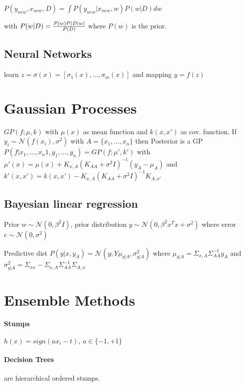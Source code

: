 \documentclass[11pt,twocolumn]{article}
\begin{document}
$P(y_{new}, x_{new}, D) = \int  P(y_{new}|x_{new}, w) P(w|D) dw$

with $P(w|D) = {{P(w) P(D|w)} \over {P(D)}}$ where $P(w)$ is the prior. 


\subsection{Neural Networks}
learn $z = \sigma(x) = [\sigma_1(x),...,\sigma_m(x)] $ and mapping $y=f(z)$

\section{Gaussian Processes}

$GP(f; \mu, k)$ with $\mu(x)$ as mean function and $k(x,x')$ as cov. function. If $y_i \sim \mathcal{N}(f(x_i), \sigma^2)$ with $A = \lbrace x_1,...,x_n \rbrace$ then Posterior is a GP $P(f|x_1,...,x_n1,y_1,...,y_n) = GP(f;\mu' , k' )$ with $\mu'(x) = \mu(x) + K _{x,A}(K_{AA}+\sigma^2 I)^{-1}(y_A - \mu_A)$ and $k' (x,x' ) = k(x,x')  - K_{x,A}(K_{AA} + \sigma^2I )^{-1} K_{A,x'}$



\subsection{Bayesian linear regression}

Prior $w \sim \mathcal{N}(0, \beta^2I)$, prior distribution $y \sim \mathcal{N}(0,\beta^2x^Tx+\sigma^2)$ where error $e \sim \mathcal{N}(0,\sigma^2)$

Predictive dist $P(y|x,y_A) 
= \mathcal{N}(y;Y \mu_{y|A}, \sigma^2_{y|A})$ where $\mu_{y|A} = \Sigma_{x,A} \Sigma^{-1}_{AA}y_A$ and $\sigma_{y|A}^2 = \Sigma_{xx}-\Sigma_{x,A} \Sigma^{-1}_{AA} \Sigma_{A,x}$



\section{Ensemble Methods}

\paragraph{Stumps}
$h(x) = sign(ax_i - t), ~a \in \lbrace-1,+1\rbrace $ 

\paragraph{Decision Trees} are hierarchical ordered stumps.
\end{document}

